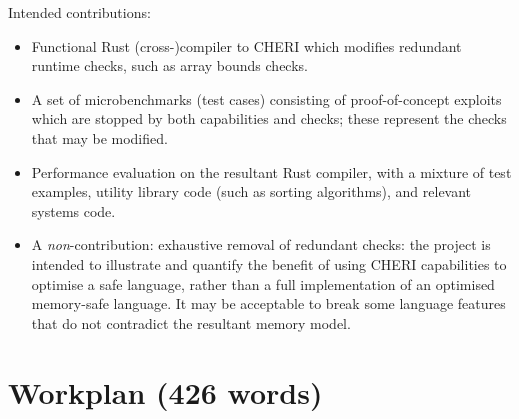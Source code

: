 \documentclass[11pt]{article}
\begin{document}
Intended contributions:
\begin{itemize}
  \item Functional Rust (cross-)compiler to CHERI which modifies redundant runtime checks, such as array bounds checks.
  \item A set of microbenchmarks (test cases) consisting of proof-of-concept exploits which are stopped by both capabilities and checks; these represent the checks that may be modified.
  \item Performance evaluation on the resultant Rust compiler, with a mixture of test examples, utility library code (such as sorting algorithms), and relevant systems code.
  \item A \emph{non}-contribution: exhaustive removal of redundant checks: the project is intended to illustrate and quantify the benefit of using CHERI capabilities to optimise a safe language, rather than a full implementation of an optimised memory-safe language. It may be acceptable to break some language features that do not contradict the resultant memory model.
\end{itemize}

\section{Workplan (426 words)}
\end{document}
